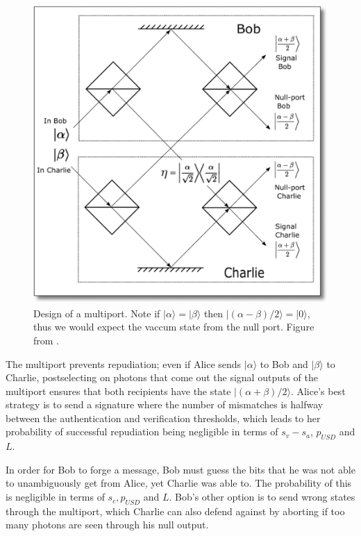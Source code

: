 \documentclass[%
 reprint,
 amsmath,amssymb,
 aps,
 pra,
]{revtex4-1}
\begin{document}
\begin{figure}
\includegraphics[width=\linewidth]{multiport.png}
\caption{Design of a multiport. Note if $|\alpha\rangle = |\beta\rangle$ then $|(\alpha - \beta)/2\rangle = |0\rangle$, thus we would expect the vaccum state from the null port. Figure from \cite{PhysRevLett.112.040502}.}
\label{fig:multiport}
\end{figure}

The multiport prevents repudiation; even if Alice sends $|\alpha\rangle$ to Bob and $|\beta\rangle$ to Charlie, postselecting on photons that come out the signal outputs of the multiport ensures that both recipients have the state $|(\alpha + \beta)/2\rangle$. Alice's best strategy is to send a signature where the number of mismatches is halfway between the authentication and verification thresholds, which leads to her probability of successful repudiation being negligible in terms of $s_v - s_a$, $p_{USD}$ and $L$.

In order for Bob to forge a message, Bob must guess the bits that he was not able to unambiguously get from Alice, yet Charlie was able to. The probability of this is negligible in terms of $s_c, p_{USD}$ and $L$. Bob's other option is to send wrong states through the multiport, which Charlie can also defend against by aborting if too many photons are seen through his null output.
\end{document}
